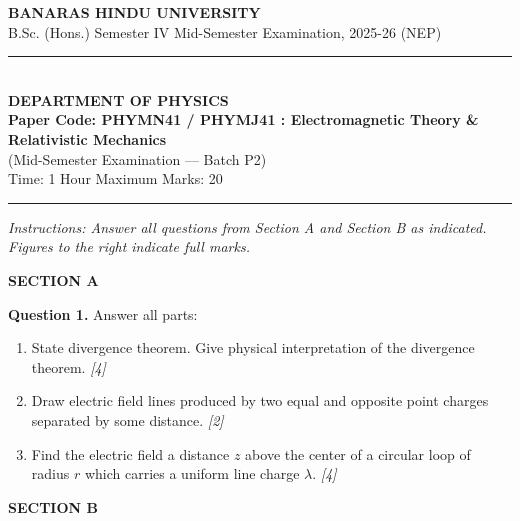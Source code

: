 \documentclass[11pt,a4paper]{article}
\newcommand{\pts}[1]{\hfill \textit{[#1]}}
\begin{document}
\begin{center}
  {\large\bfseries BANARAS HINDU UNIVERSITY}\\[2pt]
  {\normalsize B.Sc. (Hons.) Semester IV Mid-Semester Examination, 2025-26 (NEP)}\\[6pt]
  \rule{0.8\linewidth}{0.5pt}\\[6pt]
  {\large\bfseries DEPARTMENT OF PHYSICS}\\[4pt]
  {\large\bfseries Paper Code: PHYMN41 / PHYMJ41 : Electromagnetic Theory \& Relativistic Mechanics}\\[2pt]
  {\normalsize (Mid-Semester Examination --- Batch P2)}\\[4pt]
  {\normalsize Time: 1 Hour \hfill Maximum Marks: 20}
\end{center}
\rule{\linewidth}{0.4pt}
\smallskip

\noindent \textit{Instructions: Answer all questions from Section A and Section B as indicated. Figures to the right indicate full marks.}

\bigskip

\begin{center}
  {\large\bfseries SECTION A}
\end{center}

\bigskip

\noindent \textbf{Question 1.} Answer all parts:
\begin{enumerate}[label=(\alph*),itemsep=10pt,topsep=6pt]
  \item State divergence theorem. Give physical interpretation of the divergence theorem. \pts{4}
  
  \item Draw electric field lines produced by two equal and opposite point charges separated by some distance. \pts{2}
  
  \item Find the electric field a distance $z$ above the center of a circular loop of radius $r$ which carries a uniform line charge $\lambda$. \pts{4}
\end{enumerate}

\bigskip
\bigskip

\begin{center}
  {\large\bfseries SECTION B}
\end{center}

\bigskip
\end{document}
